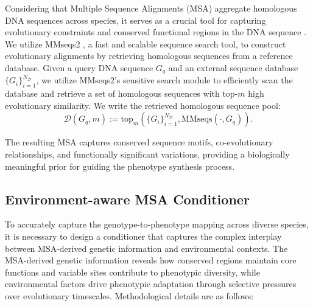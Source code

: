 \label{sec:Constructing}
Considering that Multiple Sequence Alignments (MSA) aggregate homologous DNA sequences across species, it serves as a crucial tool for capturing evolutionary constraints and conserved functional regions in the DNA sequence \citep{zhang2024historical, zou2015halign}. We utilize MMseqs2 \citep{steinegger2017mmseqs2}, a fast and scalable sequence search tool, to construct evolutionary alignments by retrieving homologous sequences from a reference database.
Given a query DNA sequence $G_q$ and an external sequence database $\{G_i\}_{i=1}^{N_{\mathcal{D}}}$, we utilize MMseqs2’s sensitive search module to efficiently scan the database and retrieve a set of homologous sequences with top-$m$ high evolutionary similarity.
We write the retrieved homologous sequence pool:
\begin{equation}
\mathcal{D}(G_q,m) := \text{top}_m (\{G_i\}_{i=1}^{N_{\mathcal{D}}}, \text{MMseqs}(\cdot, G_q)).
\end{equation}






The resulting MSA captures conserved sequence motifs, co-evolutionary relationships, and functionally significant variations, providing a biologically meaningful prior for guiding the phenotype synthesis process.




\subsection{Environment-aware MSA Conditioner}
\label{sec:G2P}
To accurately capture the genotype-to-phenotype mapping across diverse species, it is necessary to design a conditioner that captures the complex interplay between MSA-derived genetic information and environmental contexts.
The MSA-derived genetic information reveals how conserved regions maintain core functions and variable sites contribute to phenotypic diversity, while environmental factors drive phenotypic adaptation through selective pressures over evolutionary timescales. Methodological details are as follows:


